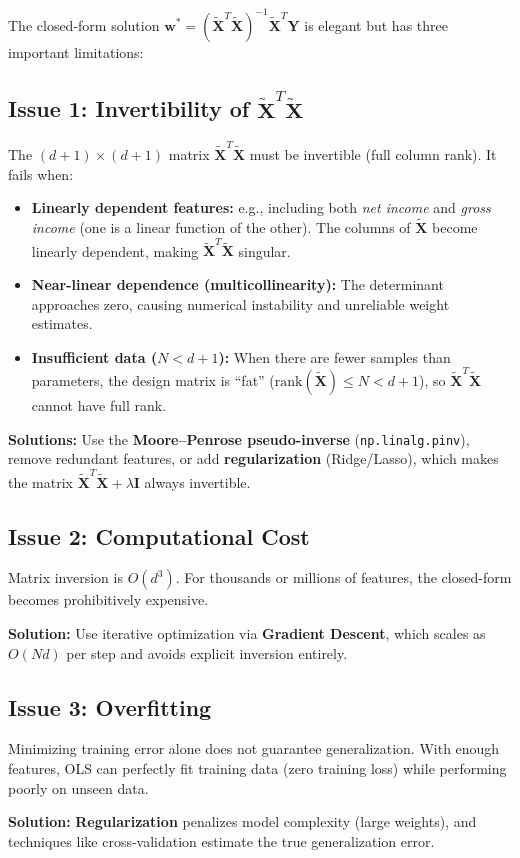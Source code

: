 The closed-form solution $\mathbf{w}^* = (\tilde{\mathbf{X}}^T \tilde{\mathbf{X}})^{-1} \tilde{\mathbf{X}}^T \mathbf{Y}$ is elegant but has three important limitations:

\subsection*{Issue 1: Invertibility of $\tilde{\mathbf{X}}^T \tilde{\mathbf{X}}$}

The $(d+1) \times (d+1)$ matrix $\tilde{\mathbf{X}}^T \tilde{\mathbf{X}}$ must be invertible (full column rank). It fails when:

\begin{itemize}
    \item \textbf{Linearly dependent features:} e.g., including both \textit{net income} and \textit{gross income} (one is a linear function of the other). The columns of $\tilde{\mathbf{X}}$ become linearly dependent, making $\tilde{\mathbf{X}}^T \tilde{\mathbf{X}}$ singular.
    \item \textbf{Near-linear dependence (multicollinearity):} The determinant approaches zero, causing numerical instability and unreliable weight estimates.
    \item \textbf{Insufficient data ($N < d+1$):} When there are fewer samples than parameters, the design matrix is ``fat'' ($\text{rank}(\tilde{\mathbf{X}}) \leq N < d+1$), so $\tilde{\mathbf{X}}^T \tilde{\mathbf{X}}$ cannot have full rank.
\end{itemize}

\textbf{Solutions:} Use the \textbf{Moore--Penrose pseudo-inverse} (\texttt{np.linalg.pinv}), remove redundant features, or add \textbf{regularization} (Ridge/Lasso), which makes the matrix $\tilde{\mathbf{X}}^T \tilde{\mathbf{X}} + \lambda \mathbf{I}$ always invertible.

\subsection*{Issue 2: Computational Cost}

Matrix inversion is $O(d^3)$. For thousands or millions of features, the closed-form becomes prohibitively expensive.

\textbf{Solution:} Use iterative optimization via \textbf{Gradient Descent}, which scales as $O(Nd)$ per step and avoids explicit inversion entirely.

\subsection*{Issue 3: Overfitting}

Minimizing training error alone does not guarantee generalization. With enough features, OLS can perfectly fit training data (zero training loss) while performing poorly on unseen data.

\textbf{Solution:} \textbf{Regularization} penalizes model complexity (large weights), and techniques like cross-validation estimate the true generalization error.
